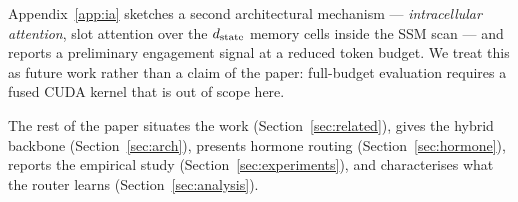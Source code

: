 Appendix~\ref{app:ia} sketches a second architectural mechanism --- \emph{intracellular attention}, slot attention over the $d_{\text{state}}$ memory cells inside the SSM scan --- and reports a preliminary engagement signal at a reduced token budget. We treat this as future work rather than a claim of the paper: full-budget evaluation requires a fused CUDA kernel that is out of scope here.

The rest of the paper situates the work (Section~\ref{sec:related}), gives the hybrid backbone (Section~\ref{sec:arch}), presents hormone routing (Section~\ref{sec:hormone}), reports the empirical study (Section~\ref{sec:experiments}), and characterises what the router learns (Section~\ref{sec:analysis}).
